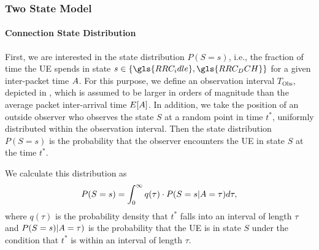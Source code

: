\subsubsection*{Two State Model}\label{sec:network:performance_model:analytical_model:two_states}

\newcommand{\RRCState}{S\xspace}
\newcommand{\PacketIATDensity}{a\xspace}
\newcommand{\RRCStateRealization}{s\xspace}
\newcommand{\ObservationInterval}{T_{\text{Obs}}\xspace}
\newcommand{\ObservationPoint}{t^*\xspace}
\newcommand{\ObservationIntervalDensity}{q\xspace}
\newcommand{\ObservationIntervalLength}{\tau\xspace}
\newcommand{\NormalisationConstant}{c_0\xspace}
\newcommand{\NObservedPackets}{n_{\text{P}}\xspace}

\paragraph*{Connection State Distribution}
First, we are interested in the state distribution \(P(\RRCState=\RRCStateRealization)\), i.e., the fraction of time the \gls{UE} spends in state \(\RRCStateRealization\in\{\gls{RRC_idle},\gls{RRC_DCH}\}\) for a given inter-packet time \(A\).
For this purpose, we define an observation interval \(\ObservationInterval\), depicted in , which is assumed to be larger in orders of magnitude than the average packet inter-arrival time \(E[A]\).
In addition, we take the position of an outside observer who observes the state \(\RRCState\) at a random point in time \(\ObservationPoint\), uniformly distributed within the observation interval.
Then the state distribution \(P(\RRCState=\RRCStateRealization)\) is the probability that the observer encounters the \gls{UE} in state \(\RRCState\) at the time \(\ObservationPoint\).

We calculate this distribution as
\begin{equation}
P(\RRCState=\RRCStateRealization)=
  \int_{0}^\infty \ObservationIntervalDensity(\tau) \cdot
  P(\RRCState=\RRCStateRealization \vert \PacketIAT = \ObservationIntervalLength) d\ObservationIntervalLength,
  \label{eq:network:performance_model:system_description:state_distribution}
\end{equation}
where \(\ObservationIntervalDensity(\ObservationIntervalLength)\) is the probability density that \(\ObservationPoint\) falls into an interval of length \(\ObservationIntervalLength\) and
\(P(\RRCState=\RRCStateRealization) \vert \PacketIAT = \ObservationIntervalLength)\)
is the probability that the \gls{UE} is in state \(\RRCState\) under the condition that \(\ObservationPoint\) is within an interval of length \(\ObservationIntervalLength\).

